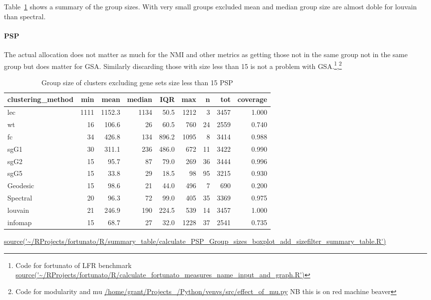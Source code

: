 Table~\ref{tab:Group size of clusters excluding gene sets size less than 15} shows a summary of the group sizes. With very small groups excluded mean and median group size are almost doble for louvain than spectral. 
\paragraph{PSP}





  The actual allocation does not matter as much for the NMI and other metrics as getting those not in the same group not in the same group but does matter for GSA. Similarly discarding those with size less than 15 is not a problem with GSA.\footnote{Code for fortunato of LFR benchmark \url{source('~/RProjects/fortunato/R/calculate_fortunato_measures_name_input_and_graph.R')}},\footnote{Code for modularity and mu \url{/home/grant/Projects_/Python/venvs/src/effect_of_mu.py} NB this is on red machine beaver}

\begin{table}[ht]
\centering
\begin{tabular}{lrrrrrrrr}
  \toprule
clustering\_method & min & mean & median & IQR & max & n & tot & coverage \\ 
  \midrule
lec & 1111 & 1152.3 & 1134 & 50.5 & 1212 & 3 & 3457 & 1.000 \\ 
  wt & 16 & 106.6 & 26 & 60.5 & 760 & 24 & 2559 & 0.740 \\ 
  fc & 34 & 426.8 & 134 & 896.2 & 1095 & 8 & 3414 & 0.988 \\ 
  sgG1 & 30 & 311.1 & 236 & 486.0 & 672 & 11 & 3422 & 0.990 \\ 
  sgG2 & 15 & 95.7 & 87 & 79.0 & 269 & 36 & 3444 & 0.996 \\ 
  sgG5 & 15 & 33.8 & 29 & 18.5 & 98 & 95 & 3215 & 0.930 \\ 
  Geodesic & 15 & 98.6 & 21 & 44.0 & 496 & 7 & 690 & 0.200 \\ 
  Spectral & 20 & 96.3 & 72 & 99.0 & 405 & 35 & 3369 & 0.975 \\ 
  louvain & 21 & 246.9 & 190 & 224.5 & 539 & 14 & 3457 & 1.000 \\ 
  infomap & 15 & 68.7 & 27 & 32.0 & 1228 & 37 & 2541 & 0.735 \\ 
   \bottomrule
\end{tabular}
\caption{Group size of clusters excluding gene sets size less than 15 PSP} 
\tiny\url{source('~/RProjects/fortunato/R/summary_table/calculate_PSP_Group_sizes_boxplot_add_sizefilter_summary_table.R')}
\label{tab:Group size of clusters excluding gene sets size less than 15}
\end{table}



